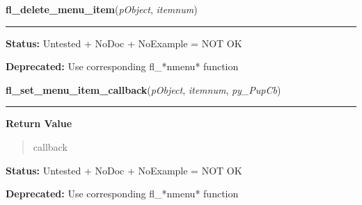     \label{xformslib:library:fl_delete_menu_item}

    \vspace{0.5ex}

\hspace{.8\funcindent}\begin{boxedminipage}{\funcwidth}

    \raggedright \textbf{fl\_delete\_menu\_item}(\textit{pObject}, \textit{itemnum})

    \vspace{-1.5ex}

    \rule{\textwidth}{0.5\fboxrule}
\setlength{\parskip}{2ex}
\setlength{\parskip}{1ex}
\textbf{Status:} Untested + NoDoc + NoExample = NOT OK



\textbf{Deprecated:} Use corresponding fl\_*nmenu* function



    \end{boxedminipage}

    \label{xformslib:library:fl_set_menu_item_callback}

    \vspace{0.5ex}

\hspace{.8\funcindent}\begin{boxedminipage}{\funcwidth}

    \raggedright \textbf{fl\_set\_menu\_item\_callback}(\textit{pObject}, \textit{itemnum}, \textit{py\_PupCb})

    \vspace{-1.5ex}

    \rule{\textwidth}{0.5\fboxrule}
\setlength{\parskip}{2ex}
\setlength{\parskip}{1ex}
      \textbf{Return Value}
    \vspace{-1ex}

      \begin{quote}
      callback

      \end{quote}

\textbf{Status:} Untested + NoDoc + NoExample = NOT OK



\textbf{Deprecated:} Use corresponding fl\_*nmenu* function



    \end{boxedminipage}

